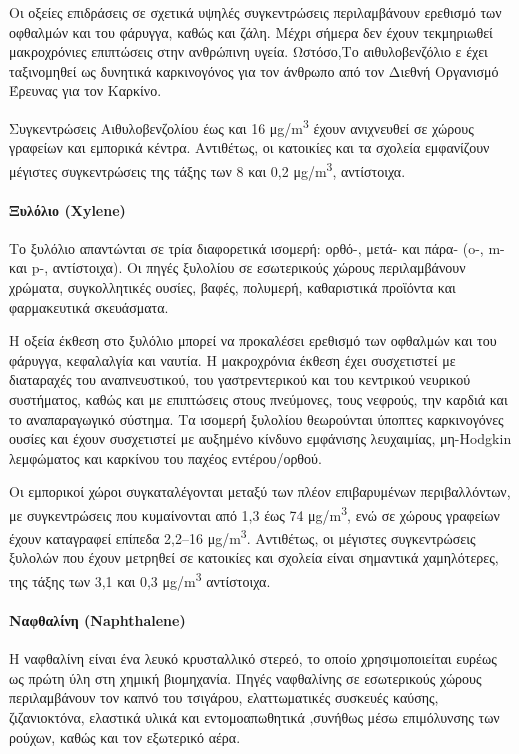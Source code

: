 Οι οξείες επιδράσεις σε σχετικά υψηλές συγκεντρώσεις περιλαμβάνουν ερεθισμό των οφθαλμών και του φάρυγγα, καθώς και ζάλη. Μέχρι σήμερα δεν έχουν τεκμηριωθεί μακροχρόνιες επιπτώσεις στην ανθρώπινη υγεία. Ωστόσο,Το αιθυλοβενζόλιο ε έχει ταξινομηθεί ως δυνητικά καρκινογόνος για τον άνθρωπο από τον Διεθνή Οργανισμό Έρευνας για τον Καρκίνο.

Συγκεντρώσεις Αιθυλοβενζολίου έως και 16 μg/m\textsuperscript{3} έχουν ανιχνευθεί σε χώρους γραφείων και εμπορικά κέντρα. Αντιθέτως, οι κατοικίες και τα σχολεία εμφανίζουν μέγιστες συγκεντρώσεις της τάξης των 8 και 0,2 μg/m\textsuperscript{3}, αντίστοιχα.

\paragraph{Ξυλόλιο (Xylene)}

Το ξυλόλιο απαντώνται σε τρία διαφορετικά ισομερή: ορθό-, μετά- και πάρα- (o-, m- και p-, αντίστοιχα). Οι πηγές ξυλολίου σε εσωτερικούς χώρους περιλαμβάνουν χρώματα, συγκολλητικές ουσίες, βαφές, πολυμερή, καθαριστικά προϊόντα και φαρμακευτικά σκευάσματα.

Η οξεία έκθεση στο ξυλόλιο μπορεί να προκαλέσει ερεθισμό των οφθαλμών και του φάρυγγα, κεφαλαλγία και ναυτία. Η μακροχρόνια έκθεση έχει συσχετιστεί με διαταραχές του αναπνευστικού, του γαστρεντερικού και του κεντρικού νευρικού συστήματος, καθώς και με επιπτώσεις στους πνεύμονες, τους νεφρούς, την καρδιά και το αναπαραγωγικό σύστημα. Τα ισομερή ξυλολίου θεωρούνται ύποπτες καρκινογόνες ουσίες και έχουν συσχετιστεί με αυξημένο κίνδυνο εμφάνισης λευχαιμίας, μη-Hodgkin λεμφώματος και καρκίνου του παχέος εντέρου/ορθού.

Οι εμπορικοί χώροι συγκαταλέγονται μεταξύ των πλέον επιβαρυμένων περιβαλλόντων, με συγκεντρώσεις που κυμαίνονται από 1,3 έως 74 μg/m\textsuperscript{3}, ενώ σε χώρους γραφείων έχουν καταγραφεί επίπεδα 2,2–16 μg/m\textsuperscript{3}. Αντιθέτως, οι μέγιστες συγκεντρώσεις ξυλολών που έχουν μετρηθεί σε κατοικίες και σχολεία είναι σημαντικά χαμηλότερες, της τάξης των 3,1 και 0,3 μg/m\textsuperscript{3} αντίστοιχα.

\paragraph{Ναφθαλίνη (Naphthalene)}

Η ναφθαλίνη είναι ένα λευκό κρυσταλλικό στερεό, το οποίο χρησιμοποιείται ευρέως ως πρώτη ύλη στη χημική βιομηχανία. Πηγές ναφθαλίνης σε εσωτερικούς χώρους περιλαμβάνουν τον καπνό του τσιγάρου, ελαττωματικές συσκευές καύσης, ζιζανιοκτόνα, ελαστικά υλικά και εντομοαπωθητικά ,συνήθως μέσω επιμόλυνσης των ρούχων, καθώς και τον εξωτερικό αέρα.

